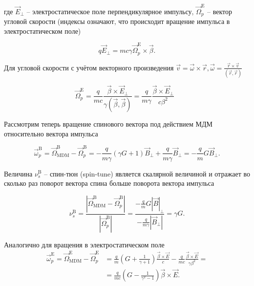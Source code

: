 \noindent где ${\vec{E}}_\bot$ – электростатическое поле перпендикулярное импульсу, ${\vec{\Omega}}_p^{\textrm{E}}$ – вектор угловой скорости (индексы означают, что происходит вращение импульса в электростатическом поле)

\begin{equation}
q{\vec{E}}_\bot=mc\gamma{\vec{\Omega}}_p^{\textrm{E}}\times\vec{\beta}.
\end{equation} 

\noindent Для угловой скорости с учётом векторного произведения $\vec{v}=\vec{\omega}\times\vec{r}, \vec{\omega}=\frac{\vec{r}\times\vec{v}}{(\vec{r},\vec{r})}$

\begin{equation}
{\vec{\Omega}}_p^{\textrm{E}}=\frac{q}{mc}\frac{\vec{\beta}\times{\vec{E}}_\bot}{\gamma(\vec{\beta},\vec{\beta})}=\frac{q}{m\gamma}\frac{\vec{\beta}\times{\vec{E}}_\bot}{c\beta^2}\ \ \ 
\end{equation}

\par Рассмотрим теперь вращение спинового вектора под действием МДМ относительно вектора импульса

\begin{equation}
{\vec{\omega}}_p^{\textrm{B}}={\vec{\Omega}}_{\textrm{MDM}}^\textrm{B}-{\vec{\Omega}}_p^{\textrm{B}}=-\frac{q}{m\gamma}\left(\gamma G+1\right){\vec{B}}_\bot+\frac{q}{m\gamma}{\vec{B}}_\bot=-\frac{q}{m}{G\vec{B}}_\bot.
\end{equation}

\noindent Величина $\nu_s^{\textrm{B}}$ -- спин-тюн (spin-tune) является скалярной величиной и отражает во сколько раз поворот вектора спина больше поворота вектора импульса

\begin{equation} \label{eq:spintune_B}
\nu_s^{\textrm{B}}=\frac{\left|{\vec{\Omega}}_{\textrm{MDM}}^{\textrm{B}}-{\vec{\Omega}}_p^{\textrm{B}}\right|}{\left|{\vec{\Omega}}_p^{\textrm{B}}\right|}=\frac{-\frac{q}{m}{G\left|\vec{B}\right|}_\bot}{-\frac{q}{m\gamma}\left|{\vec{B}}_\bot\right|}=\gamma G.
\end{equation}

\noindent Аналогично для вращения в электростатическом поле
\begin{equation}
\begin{aligned}
{\vec{\omega}}_p^{\textrm{E}}={\vec{\Omega}}_{\textrm{MDM}}^{\textrm{E}}-{\vec{\Omega}}_p^{\textrm{E}}&=\frac{q}{m}\left(G+\frac{1}{\gamma+1}\right)\frac{\vec{\beta}\times\vec{E}}{c}-\frac{q}{mc}\frac{\vec{\beta}\times\vec{E}}{\gamma\beta^2} =\\
&=\frac{q}{mc}\left(G-\frac{1}{\gamma^2-1}\right)\vec{\beta}\times\vec{E}.
\end{aligned}
\end{equation}

